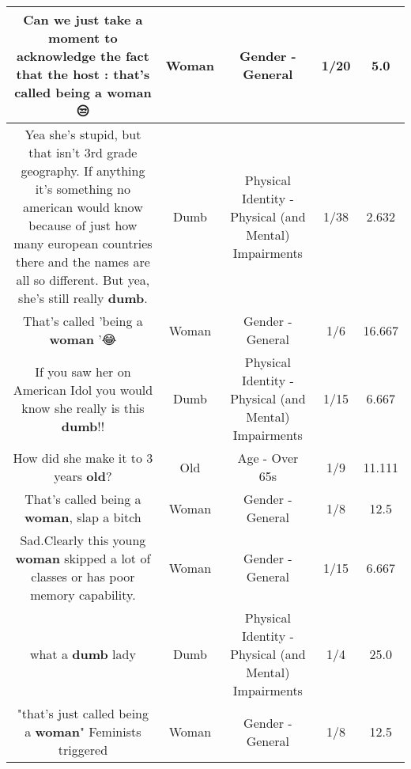 \documentclass[11pt]{article}
\newlength\mylength
\begin{document}
\begin{center}
\begin{longtable}{|C{.65\mylength}|C{.30\mylength}|C{.12\mylength}|C{.12\mylength}|C{.12\mylength}|}
  \small Can we just take a moment to acknowledge the fact that the host : that's called being a \textbf{woman} 😒\normalsize   & Woman & Gender - General & 1/20 & 5.0 \\  \hline
  \small Yea she's stupid, but that isn't 3rd grade geography. If anything it's something no american would know because of just how many european countries there and the names are all so different. But yea, she's still really \textbf{dumb}.\normalsize   & Dumb & Physical Identity - Physical (and Mental) Impairments & 1/38 & 2.632 \\  \hline
  \small That's called 'being a \textbf{woman} '😂\normalsize   & Woman & Gender - General & 1/6 & 16.667 \\  \hline
  \small If you saw her on American Idol you would know she really is this \textbf{dumb}!!\normalsize   & Dumb & Physical Identity - Physical (and Mental) Impairments & 1/15 & 6.667 \\  \hline
  \small How did she make it to 3 years \textbf{old}?\normalsize   & Old & Age - Over 65s & 1/9 & 11.111 \\  \hline
  \small That's called being a \textbf{woman}, slap a bitch\normalsize   & Woman & Gender - General & 1/8 & 12.5 \\  \hline
  \small Sad.Clearly this young \textbf{woman} skipped a lot of classes or has poor memory capability.\normalsize   & Woman & Gender - General & 1/15 & 6.667 \\  \hline
  \small what a \textbf{dumb} lady\normalsize   & Dumb & Physical Identity - Physical (and Mental) Impairments & 1/4 & 25.0 \\  \hline
  \small "that's just called being a \textbf{woman}" Feminists triggered\normalsize   & Woman & Gender - General & 1/8 & 12.5 \\  \hline

\end{longtable}
\end{center}
\end{document}

